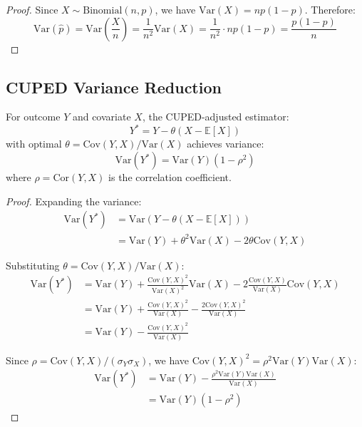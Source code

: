 \begin{proof}
Since $X \sim \text{Binomial}(n, p)$, we have $\text{Var}(X) = np(1-p)$. Therefore:
\begin{equation}
\text{Var}(\hat{p}) = \text{Var}\left(\frac{X}{n}\right) = \frac{1}{n^2}\text{Var}(X) = \frac{1}{n^2} \cdot np(1-p) = \frac{p(1-p)}{n}
\end{equation}
\end{proof}

\subsection{CUPED Variance Reduction}

\begin{theorem}
For outcome $Y$ and covariate $X$, the CUPED-adjusted estimator:
\begin{equation}
Y^* = Y - \theta(X - \mathbb{E}[X])
\end{equation}
with optimal $\theta = \text{Cov}(Y, X)/\text{Var}(X)$ achieves variance:
\begin{equation}
\text{Var}(Y^*) = \text{Var}(Y)(1 - \rho^2)
\end{equation}
where $\rho = \text{Cor}(Y, X)$ is the correlation coefficient.
\end{theorem}

\begin{proof}
Expanding the variance:
\begin{align}
\text{Var}(Y^*) &= \text{Var}(Y - \theta(X - \mathbb{E}[X])) \\
&= \text{Var}(Y) + \theta^2\text{Var}(X) - 2\theta\text{Cov}(Y, X)
\end{align}

Substituting $\theta = \text{Cov}(Y, X)/\text{Var}(X)$:
\begin{align}
\text{Var}(Y^*) &= \text{Var}(Y) + \frac{\text{Cov}(Y,X)^2}{\text{Var}(X)^2}\text{Var}(X) - 2\frac{\text{Cov}(Y,X)}{\text{Var}(X)}\text{Cov}(Y, X) \\
&= \text{Var}(Y) + \frac{\text{Cov}(Y,X)^2}{\text{Var}(X)} - \frac{2\text{Cov}(Y,X)^2}{\text{Var}(X)} \\
&= \text{Var}(Y) - \frac{\text{Cov}(Y,X)^2}{\text{Var}(X)}
\end{align}

Since $\rho = \text{Cov}(Y,X)/(\sigma_Y\sigma_X)$, we have $\text{Cov}(Y,X)^2 = \rho^2\text{Var}(Y)\text{Var}(X)$:
\begin{align}
\text{Var}(Y^*) &= \text{Var}(Y) - \frac{\rho^2\text{Var}(Y)\text{Var}(X)}{\text{Var}(X)} \\
&= \text{Var}(Y)(1 - \rho^2)
\end{align}
\end{proof}


